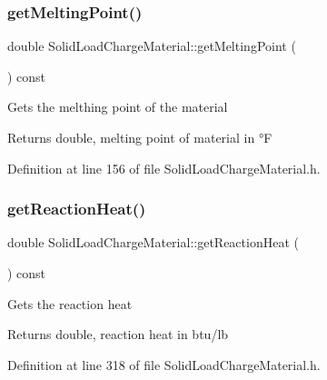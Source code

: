 \subsubsection{\texorpdfstring{get\+Melting\+Point()}{getMeltingPoint()}\hspace{0.1cm}{\footnotesize\ttfamily [3/3]}}
{\footnotesize\ttfamily double Solid\+Load\+Charge\+Material\+::get\+Melting\+Point (\begin{DoxyParamCaption}{ }\end{DoxyParamCaption}) const\hspace{0.3cm}{\ttfamily [inline]}}

Gets the melthing point of the material \begin{DoxyReturn}{Returns}
double, melting point of material in °F 
\end{DoxyReturn}


Definition at line 156 of file Solid\+Load\+Charge\+Material.\+h.

\mbox{\label{class_solid_load_charge_material_a3481dc84063babc3514a4173e6bd9341}} 
\subsubsection{\texorpdfstring{get\+Reaction\+Heat()}{getReactionHeat()}\hspace{0.1cm}{\footnotesize\ttfamily [1/3]}}
{\footnotesize\ttfamily double Solid\+Load\+Charge\+Material\+::get\+Reaction\+Heat (\begin{DoxyParamCaption}{ }\end{DoxyParamCaption}) const\hspace{0.3cm}{\ttfamily [inline]}}

Gets the reaction heat \begin{DoxyReturn}{Returns}
double, reaction heat in btu/lb 
\end{DoxyReturn}


Definition at line 318 of file Solid\+Load\+Charge\+Material.\+h.

\mbox{\label{class_solid_load_charge_material_a3481dc84063babc3514a4173e6bd9341}} 
